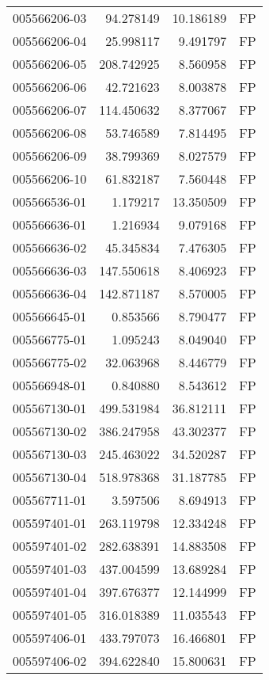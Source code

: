 \begin{tabular}{lrrl}
005566206-03 &   94.278149 &    10.186189 &   FP \\
005566206-04 &   25.998117 &     9.491797 &   FP \\
005566206-05 &  208.742925 &     8.560958 &   FP \\
005566206-06 &   42.721623 &     8.003878 &   FP \\
005566206-07 &  114.450632 &     8.377067 &   FP \\
005566206-08 &   53.746589 &     7.814495 &   FP \\
005566206-09 &   38.799369 &     8.027579 &   FP \\
005566206-10 &   61.832187 &     7.560448 &   FP \\
005566536-01 &    1.179217 &    13.350509 &   FP \\
005566636-01 &    1.216934 &     9.079168 &   FP \\
005566636-02 &   45.345834 &     7.476305 &   FP \\
005566636-03 &  147.550618 &     8.406923 &   FP \\
005566636-04 &  142.871187 &     8.570005 &   FP \\
005566645-01 &    0.853566 &     8.790477 &   FP \\
005566775-01 &    1.095243 &     8.049040 &   FP \\
005566775-02 &   32.063968 &     8.446779 &   FP \\
005566948-01 &    0.840880 &     8.543612 &   FP \\
005567130-01 &  499.531984 &    36.812111 &   FP \\
005567130-02 &  386.247958 &    43.302377 &   FP \\
005567130-03 &  245.463022 &    34.520287 &   FP \\
005567130-04 &  518.978368 &    31.187785 &   FP \\
005567711-01 &    3.597506 &     8.694913 &   FP \\
005597401-01 &  263.119798 &    12.334248 &   FP \\
005597401-02 &  282.638391 &    14.883508 &   FP \\
005597401-03 &  437.004599 &    13.689284 &   FP \\
005597401-04 &  397.676377 &    12.144999 &   FP \\
005597401-05 &  316.018389 &    11.035543 &   FP \\
005597406-01 &  433.797073 &    16.466801 &   FP \\
005597406-02 &  394.622840 &    15.800631 &   FP \\

\end{tabular}
